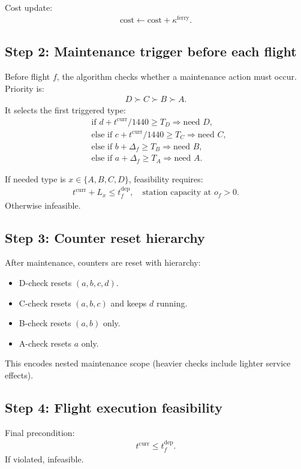 \documentclass[11pt,a4paper]{article}
\begin{document}
Cost update:
\begin{align*}
\text{cost} \leftarrow \text{cost} + \kappa^{\text{ferry}}.
\end{align*}

\subsection{Step 2: Maintenance trigger before each flight}
Before flight $f$, the algorithm checks whether a maintenance action must occur. Priority is:
\begin{align*}
D \succ C \succ B \succ A.
\end{align*}
It selects the first triggered type:
\begin{align*}
&\text{if } d + t^{\text{curr}}/1440 \ge T_D \Rightarrow \text{need } D,\\
&\text{else if } c + t^{\text{curr}}/1440 \ge T_C \Rightarrow \text{need } C,\\
&\text{else if } b + \Delta_f \ge T_B \Rightarrow \text{need } B,\\
&\text{else if } a + \Delta_f \ge T_A \Rightarrow \text{need } A.
\end{align*}

If needed type is $x \in \{A,B,C,D\}$, feasibility requires:
\begin{align*}
t^{\text{curr}} + L_x \le t_f^{\text{dep}}, \quad \text{station capacity at } o_f > 0.
\end{align*}
Otherwise infeasible.

\subsection{Step 3: Counter reset hierarchy}
After maintenance, counters are reset with hierarchy:
\begin{itemize}[leftmargin=1.4em]
    \item D-check resets $(a,b,c,d)$.
    \item C-check resets $(a,b,c)$ and keeps $d$ running.
    \item B-check resets $(a,b)$ only.
    \item A-check resets $a$ only.
\end{itemize}

This encodes nested maintenance scope (heavier checks include lighter service effects).

\subsection{Step 4: Flight execution feasibility}
Final precondition:
\begin{align*}
t^{\text{curr}} \le t_f^{\text{dep}}.
\end{align*}
If violated, infeasible.
\end{document}
